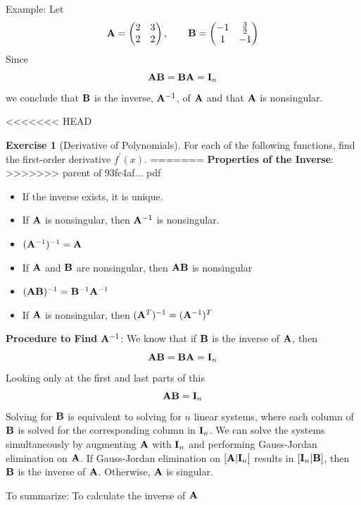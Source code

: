 \documentclass[]{book}
\theoremstyle{definition}
\theoremstyle{definition}
\theoremstyle{definition}
\newtheorem{exercise}{Exercise}[chapter]
\theoremstyle{remark}
\begin{document}
Example: Let
\[{\bf A} = \begin{pmatrix} 2&3\\2&2 \end{pmatrix}, \qquad {\bf B}=\begin{pmatrix} -1&\frac{3}{2}\\ 1&-1
        \end{pmatrix}\]
Since \[{\bf A} {\bf B} = {\bf B} {\bf A} = {\bf I}_n\] we conclude that \({\bf B}\) is the inverse, \({\bf A}^{-1}\), of \({\bf A}\) and that \({\bf A}\) is nonsingular.

<<<<<<< HEAD
\begin{exercise}[Derivative of Polynomials]
\protect\hypertarget{exr:introderivatives}{}{\label{exr:introderivatives} {} }
For each of the following functions, find the first-order derivative \(f^\prime(x)\).
=======
\textbf{Properties of the Inverse}:
>>>>>>> parent of 93fc4af... pdf

\begin{itemize}
\item
  If the inverse exists, it is unique.
\item
  If \({\bf A}\) is nonsingular, then \({\bf A}^{-1}\) is nonsingular.
\item
  \(({\bf A}^{-1})^{-1} = {\bf A}\)
\item
  If \({\bf A}\) and \({\bf B}\) are nonsingular, then \({\bf A}{\bf B}\) is nonsingular
\item
  \(({\bf A}{\bf B})^{-1} = {\bf B}^{-1}{\bf A}^{-1}\)
\item
  If \({\bf A}\) is nonsingular, then \(({\bf A}^T)^{-1}=({\bf A}^{-1})^T\)
\end{itemize}

\textbf{Procedure to Find} \({\bf A}^{-1}\): We know that if \({\bf B}\) is the inverse of \({\bf A}\), then \[{\bf A} {\bf B} = {\bf B} {\bf A} = {\bf I}_n\] Looking only at the first and last parts of this \[{\bf A} {\bf B} = {\bf I}_n\] Solving for \({\bf B}\) is equivalent to solving for \(n\) linear systems, where each column of \({\bf B}\) is solved for the corresponding column in \({\bf I}_n\). We can solve the systems simultaneously by augmenting \({\bf A}\) with \({\bf I}_n\) and performing Gauss-Jordan elimination on \({\bf A}\). If Gauss-Jordan elimination on \([{\bf A} | {\bf I}_n]\) results in \([{\bf I}_n | {\bf B} ]\), then \({\bf B}\) is the inverse of \({\bf A}\). Otherwise, \({\bf A}\) is singular.

To summarize: To calculate the inverse of \({\bf A}\)


\end{exercise}
\end{document}
